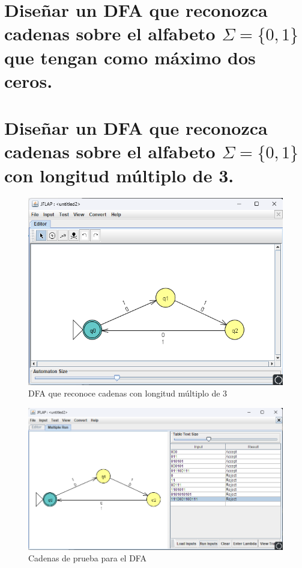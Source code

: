 \documentclass[11pt]{report}
\begin{document}
\section{Diseñar un DFA que reconozca cadenas sobre el alfabeto $\Sigma = \{0, 1\}$ que tengan como máximo dos ceros.}

\newpage

\section{Diseñar un DFA que reconozca cadenas sobre el alfabeto $\Sigma = \{0, 1\}$ con longitud múltiplo de 3.}
\begin{figure}[H]
  \centering
  \includegraphics[scale=0.6]{img/DFA_08.png}
  \caption{DFA que reconoce cadenas con longitud múltiplo de 3}
\end{figure}

\begin{figure}[H]
  \centering
  \includegraphics[scale=0.65]{img/DFA_08_test.png}
  \caption{Cadenas de prueba para el DFA}
\end{figure}
\end{document}
